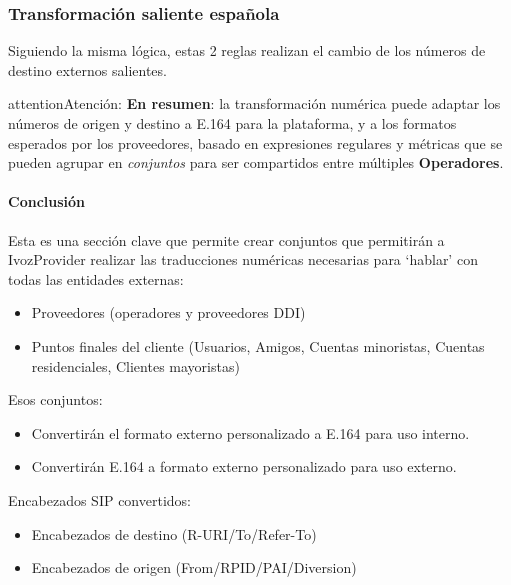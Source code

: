 \documentclass[letterpaper,10pt,spanish]{sphinxmanual}
\begin{document}
\subsubsection{Transformación saliente española}
\label{administration_portal/brand/settings/numeric_transformations:spanish-outgoing-transformation}
Siguiendo la misma lógica, estas 2 reglas realizan el cambio de los números de destino externos salientes.

\begin{notice}{attention}{Atención:}
\textbf{En resumen}: la transformación numérica puede adaptar los números de origen y destino a E.164 para la plataforma, y a los formatos esperados por los proveedores, basado en expresiones regulares y métricas que se pueden agrupar en \emph{conjuntos} para ser compartidos entre múltiples \textbf{Operadores}.
\end{notice}


\paragraph{Conclusión}
\label{administration_portal/brand/settings/numeric_transformations:conclusion}
Esta es una sección clave que permite crear conjuntos que permitirán a IvozProvider realizar las traducciones numéricas necesarias para `hablar' con todas las entidades externas:
\begin{itemize}
\item {} 
Proveedores (operadores y proveedores DDI)

\item {} 
Puntos finales del cliente (Usuarios, Amigos, Cuentas minoristas, Cuentas residenciales, Clientes mayoristas)

\end{itemize}

Esos conjuntos:
\begin{itemize}
\item {} 
Convertirán el formato externo personalizado a E.164 para uso interno.

\item {} 
Convertirán E.164 a formato externo personalizado para uso externo.

\end{itemize}

Encabezados SIP convertidos:
\begin{itemize}
\item {} 
Encabezados de destino (R-URI/To/Refer-To)

\item {} 
Encabezados de origen (From/RPID/PAI/Diversion)

\end{itemize}
\end{document}
